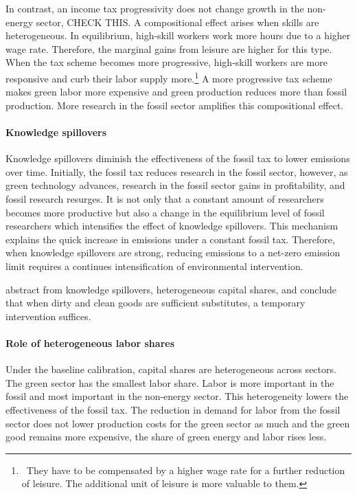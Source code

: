  In contrast, an income tax progressivity does not change growth in the non-energy sector, CHECK THIS. A compositional effect arises when skills are heterogeneous. In equilibrium, high-skill workers work more hours due to a higher wage rate. Therefore, the marginal gains from leisure are higher for this type. When the tax scheme becomes more progressive, high-skill workers are more responsive and curb their labor supply more.\footnote{\ They have to be compensated by a higher wage rate for a further reduction of leisure. The additional unit of leisure is more valuable to them.}  A more progressive tax scheme makes green labor more expensive and green production reduces more than fossil production. More research in the fossil sector amplifies this compositional effect. %
 
 \paragraph{Knowledge spillovers}
 Knowledge spillovers diminish the effectiveness of the fossil tax to lower emissions over time. Initially, the fossil tax reduces research in the fossil sector, however, as green technology advances, research in the fossil sector gains in profitability, and fossil research resurges. It is not only that a constant amount of researchers becomes more productive but also a change in the equilibrium level of fossil researchers which intensifies the effect of knowledge spillovers. This mechanism explains the quick increase in emissions under a constant fossil tax. Therefore, when knowledge spillovers are strong, reducing emissions to a net-zero emission limit requires a continues intensification of environmental intervention. 
 
 \cite{Acemoglu2012TheChange} abstract from knowledge spillovers, heterogeneous capital shares, and conclude that when dirty and clean goods are sufficient substitutes, a temporary intervention suffices. 
 \paragraph{Role of heterogeneous labor shares}
 Under the baseline calibration, capital shares are heterogeneous across sectors. The green sector has the smallest labor share. Labor is more important in the fossil and most important in the non-energy sector. This heterogeneity lowers the effectiveness of the fossil tax. The reduction in demand for labor from the fossil sector does not lower production costs for the green sector as much and the green good remains more expensive, the share of green energy and labor rises less. 

